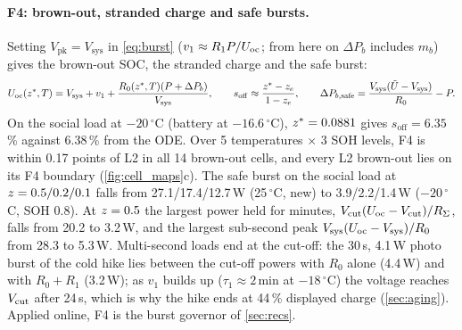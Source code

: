 \paragraph{F4: brown-out, stranded charge and safe bursts.}
Setting $V_{\mathrm{pk}}=V_{\mathrm{sys}}$ in \cref{eq:burst} ($v_1\approx R_1P/U_{\mathrm{oc}}$; from here on $\Delta P_b$
includes $m_b$) gives the brown-out SOC, the stranded charge \cite{LEE20} and the safe burst:
\begin{equation}
  U_{\mathrm{oc}}(z^*,T)=V_{\mathrm{sys}}+v_1+\frac{R_0(z^*,T)(P+\Delta P_b)}{V_{\mathrm{sys}}},\qquad
  s_{\mathrm{off}}\approx\frac{z^*-z_e}{1-z_e},\qquad
  \Delta P_{b,\mathrm{safe}}=\frac{V_{\mathrm{sys}}(\tilde U-V_{\mathrm{sys}})}{R_0}-P. \label{eq:F4}
\end{equation}
On the social load at $-20\,^\circ$C (battery at $-16.6\,^\circ$C), $z^*=0.0881$ gives $s_{\mathrm{off}}=6.35$\,\%
against 6.38\,\% from the ODE. Over 5 temperatures $\times$ 3 SOH levels, F4 is within 0.17 points of L2 in all 14
brown-out cells, and every L2 brown-out lies on its F4 boundary (\cref{fig:cell_maps}c). The safe burst on
the social load at $z=0.5/0.2/0.1$ falls from 27.1/17.4/12.7\,W (25\,$^\circ$C, new) to 3.9/2.2/1.4\,W
($-20\,^\circ$C, SOH 0.8). At $z=0.5$ the largest power held for minutes, $V_{\mathrm{cut}}(U_{\mathrm{oc}}-V_{\mathrm{cut}})/R_\Sigma$, falls
from 20.2 to 3.2\,W, and the largest sub-second peak $V_{\mathrm{sys}}(U_{\mathrm{oc}}-V_{\mathrm{sys}})/R_0$ from 28.3 to
5.3\,W. Multi-second loads end at the cut-off: the 30\,s, 4.1\,W photo burst of the cold hike lies between the
cut-off powers with $R_0$ alone (4.4\,W) and with $R_0+R_1$ (3.2\,W); as $v_1$ builds up ($\tau_1\approx2$\,min at
$-18\,^\circ$C) the voltage reaches $V_{\mathrm{cut}}$ after 24\,s, which is why the hike ends at 44\,\% displayed charge
(\cref{sec:aging}). Applied online, F4 is the burst governor of \cref{sec:recs}.

